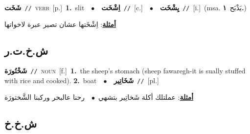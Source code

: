 \documentclass[10pt,a4paper,twoside]{article} %
\begin{document}
\begin{multicols}{2}
{\setlength\topsep{0pt}\textbf{\foreignlanguage{arabic}{شَخَت}}\ {\color{gray}\texttt{//}\color{black}}\ \textsc{verb}\ [p.]\ \textbf{1.}~slit\ \ $\bullet$\ \ \setlength\topsep{0pt}\textbf{\foreignlanguage{arabic}{اِشْخَت}}\ {\color{gray}\texttt{//}\color{black}}\ [c.]\ \ $\bullet$\ \ \setlength\topsep{0pt}\textbf{\foreignlanguage{arabic}{يِشْخَت}}\ {\color{gray}\texttt{//}\color{black}}\ [i.]\ \color{gray}(msa. \foreignlanguage{arabic}{يَذْبَح}~\foreignlanguage{arabic}{\textbf{١.}})\color{black}\  \begin{flushright}\color{gray}\foreignlanguage{arabic}{\textbf{\underline{\foreignlanguage{arabic}{أمثلة}}}: اِشْخَتها عشان تصير عبرة لاخواتها}\end{flushright}\color{black}} \vspace{2mm}

\vspace{-3mm}
\subsection*{\color{blue}\foreignlanguage{arabic}{ش.خ.ت.ر}\color{blue}{}} 

{\setlength\topsep{0pt}\textbf{\foreignlanguage{arabic}{شَخْتُورَة}}\ {\color{gray}\texttt{//}\color{black}}\ \textsc{noun}\ [f.]\ \textbf{1.}~the sheep's stomach (sheep fawaregh-it is sually stuffed with rice and cooked).  \textbf{2.}~boat\ \ $\bullet$\ \ \setlength\topsep{0pt}\textbf{\foreignlanguage{arabic}{شَخَاتِير}}\ {\color{gray}\texttt{//}\color{black}}\ [pl.]\  \begin{flushright}\color{gray}\foreignlanguage{arabic}{\textbf{\underline{\foreignlanguage{arabic}{أمثلة}}}: عملتلك أكلة شَخاتِير بتشهي\ $\bullet$\ \  رحنا عالبحر وركبنا الشَّختورَة}\end{flushright}\color{black}} \vspace{2mm}

\vspace{-3mm}
\subsection*{\color{blue}\foreignlanguage{arabic}{ش.خ.خ}\color{blue}{}} 


\end{multicols}
\end{document}
